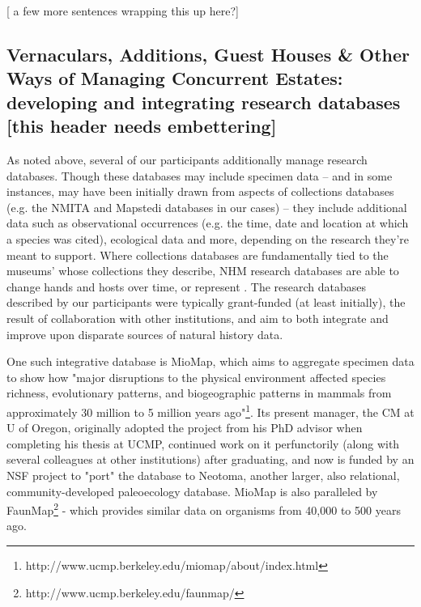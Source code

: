 [ a few more sentences wrapping this up here?]

\subsection{Vernaculars, Additions, Guest Houses \& Other Ways of Managing Concurrent Estates: developing and integrating research databases [this header needs embettering]} 

As noted above, several of our participants additionally manage research databases. Though these databases may include specimen data -- and in some instances, may have been initially drawn from aspects of collections databases (e.g. the NMITA and Mapstedi databases in our cases) -- they include additional data such as observational occurrences (e.g. the time, date and location at which a species was cited), ecological data and more, depending on the research they're meant to support. Where collections databases are fundamentally tied to the museums' whose collections they describe, NHM research databases are able to change hands and hosts over time, or represent . The research databases described by our participants were typically grant-funded (at least initially), the result of collaboration with other institutions, and aim to both integrate and improve upon disparate sources of natural history data. 

One such integrative database is MioMap, which aims to aggregate specimen data to show how "major disruptions to the physical environment affected species richness, evolutionary patterns, and biogeographic patterns in mammals from approximately 30 million to 5 million years ago"\footnote{http://www.ucmp.berkeley.edu/miomap/about/index.html}. Its present manager, the CM at U of Oregon, originally adopted the project from his PhD advisor when completing his thesis at UCMP, continued work on it perfunctorily (along with several colleagues at other institutions) after graduating, and now is funded by an NSF project to "port" the database to Neotoma, another larger, also relational, community-developed paleoecology database. MioMap is also paralleled by FaunMap\footnote{http://www.ucmp.berkeley.edu/faunmap/} - which provides similar data on organisms from 40,000 to 500 years ago.

